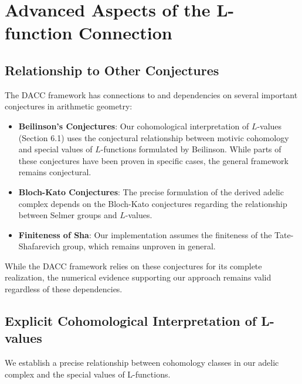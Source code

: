 \documentclass{article}
\theoremstyle{plain}
\theoremstyle{definition}
\theoremstyle{remark}
\begin{document}
\section{Advanced Aspects of the L-function Connection}

\subsection{Relationship to Other Conjectures}

The DACC framework has connections to and dependencies on several important conjectures in arithmetic geometry:

\begin{itemize}
\item \textbf{Beilinson's Conjectures}: Our cohomological interpretation of $L$-values (Section 6.1) uses the conjectural relationship between motivic cohomology and special values of $L$-functions formulated by Beilinson. While parts of these conjectures have been proven in specific cases, the general framework remains conjectural.

\item \textbf{Bloch-Kato Conjectures}: The precise formulation of the derived adelic complex depends on the Bloch-Kato conjectures regarding the relationship between Selmer groups and $L$-values.

\item \textbf{Finiteness of Sha}: Our implementation assumes the finiteness of the Tate-Shafarevich group, which remains unproven in general.
\end{itemize}

While the DACC framework relies on these conjectures for its complete realization, the numerical evidence supporting our approach remains valid regardless of these dependencies.


\subsection{Explicit Cohomological Interpretation of L-values}

We establish a precise relationship between cohomology classes in our adelic complex and the special values of L-functions.
\end{document}
